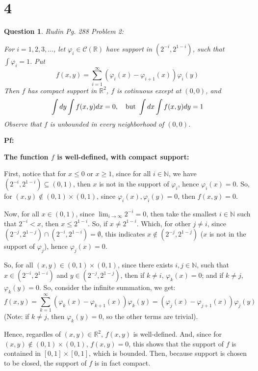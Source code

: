 \documentclass{article}
\newtheorem{question}{Question}
\begin{document}
\break

\section*{4}
\begin{myBox}[]{}
    \begin{question}
        Rudin Pg. 288 Problem 2:

        For $i=1,2,3,...$, let $\varphi_i\in \mathcal{C}(\mathbb{R})$ have support in $(2^{-i},2^{1-i})$, such that $\int\varphi_i=1$. Put 
        $$f(x,y)=\sum_{i=1}^{\infty}(\varphi_i(x)-\varphi_{i+1}(x))\varphi_i(y)$$
        Then $f$ has compact support in $\mathbb{R}^2$, $f$ is cotinuous except at $(0,0)$, and 
        $$\int dy\int f(x,y)dx = 0,\quad \textmd{but } \int dx\int f(x,y)dy = 1$$
        Observe that $f$ is unbounded in every neighborhood of $(0,0)$.
    \end{question}
\end{myBox}

\textbf{Pf:}

\textbf{The function $f$ is well-defined, with compact support:}

First, notice that for $x\leq 0$ or $x\geq 1$, since for all $i\in\mathbb{N}$, we have $(2^{-i},2^{1-i})\subseteq (0,1)$, then $x$ is not in the support of $\varphi_i$, hence $\varphi_i(x)=0$. So, for $(x,y)\notin (0,1)\times (0,1)$, since $\varphi_i(x),\varphi_i(y)=0$, then $f(x,y)=0$. 

\hfil

Now, for all $x\in (0,1)$, since $\lim_{i\rightarrow\infty}2^{-i}=0$, then take the smallest $i\in\mathbb{N}$ such that $2^{-i}<x$, then $x\leq 2^{1-i}$. So, if $x\neq 2^{1-i}$. Which, for other $j\neq i$, since $(2^{-j},2^{1-j})\cap (2^{-i},2^{1-i})=\emptyset$, this indicates $x\notin (2^{-j},2^{1-j})$ ($x$ is not in the support of $\varphi_j$), hence $\varphi_j(x)=0$.

So, for all $(x,y)\in (0,1)\times (0,1)$, since there exists $i,j\in\mathbb{N}$, such that $x\in (2^{-i},2^{1-i})$ and $y\in (2^{-j},2^{1-j})$, then if $k\neq i$, $\varphi_k(x)=0$; and if $k\neq j$, $\varphi_k(y)=0$. So, consider the infinite summation, we get:
$$f(x,y) = \sum_{k=1}^{\infty}(\varphi_k(x)-\varphi_{k+1}(x))\varphi_k(y) = (\varphi_j(x)-\varphi_{j+1}(x))\varphi_j(y)$$
(Note: if $k\neq j$, then $\varphi_k(y)=0$, so the other terms are trivial).

Hence, regardles of $(x,y)\in\mathbb{R}^2$, $f(x,y)$ is well-defined. And, since for $(x,y)\notin (0,1)\times (0,1)$, $f(x,y)=0$, this shows that the support of $f$ is contained in $[0,1]\times [0,1]$, which is bounded. Then, because support is chosen to be closed, the support of $f$ is in fact compact.
\end{document}

